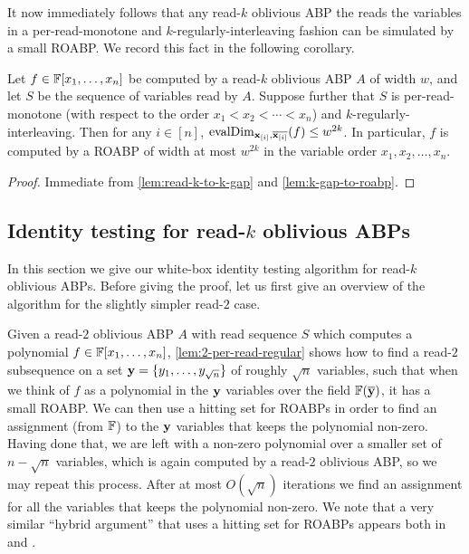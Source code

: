 \documentclass[11pt]{article}
\newcommand{\exi}{\vecx_{[i]}}
\begin{document}
It now immediately follows that any read-$k$ oblivious ABP the reads the variables in a per-read-monotone and $k$-regularly-interleaving fashion can be simulated by a small ROABP. We record this fact in the following corollary.

\begin{corollary}
\label{cor:read-k-to-roabp}
Let $f \in \F[x_1, \ldots, x_n]$ be computed by a read-$k$ oblivious ABP $A$ of width $w$, and let $S$ be the sequence of variables read by $A$. Suppose further that $S$ is per-read-monotone (with respect to the order $x_1 < x_2 < \cdots < x_n$) and $k$-regularly-interleaving.
Then for any $i \in [n]$, $\evalDim_{\exi,\overline{\exi}} (f) \le w^{2k}$. In particular, $f$ is computed by a ROABP of width at most $w^{2k}$ in the variable order $x_1, x_2, \ldots, x_n$.
\end{corollary}

\begin{proof}
Immediate from \autoref{lem:read-k-to-k-gap} and  \autoref{lem:k-gap-to-roabp}.
\end{proof}



\subsection{Identity testing for read-$k$ oblivious ABPs}

In this section we give our white-box identity testing algorithm for read-$k$ oblivious ABPs. Before giving the proof, let us first give an overview of the algorithm for the slightly simpler read-$2$ case.

Given a read-$2$ oblivious ABP $A$ with read sequence $S$ which computes a polynomial $f \in \F[x_1, \ldots, x_n]$, \autoref{lem:2-per-read-regular} shows how to find a read-$2$ subsequence on a set $\mathbf{y}=\{y_1, \ldots, y_{\sqrt{n}}\}$ of roughly $\sqrt{n}$ variables, such that when we think of $f$ as a polynomial in the $\mathbf{y}$ variables over the field $\F(\overline{\vecy})$, it has a small ROABP. We can then use a hitting set for ROABPs in order to find an assignment (from $\F$) to the $\mathbf{y}$ variables that keeps the polynomial non-zero. Having done that, we are left with a non-zero polynomial over a smaller set of $n-\sqrt{n}$ variables, which is again computed by a read-$2$ oblivious ABP, so we may repeat this process. After at most $O(\sqrt{n})$ iterations we find an assignment for all the variables that keeps the polynomial non-zero. We note that a very similar ``hybrid argument'' that uses a hitting set for ROABPs appears both in \cite{agks15} and \cite{osv15}.
\end{document}
